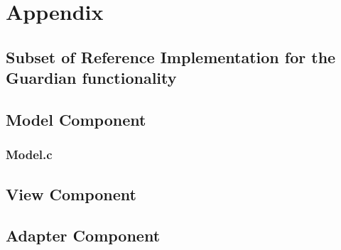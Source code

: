 \chapter{Appendix}
\section{Subset of Reference Implementation for the Guardian functionality}

\section{Model Component}
\subsection{Model.c}

\section{View Component}

\section{Adapter Component}
